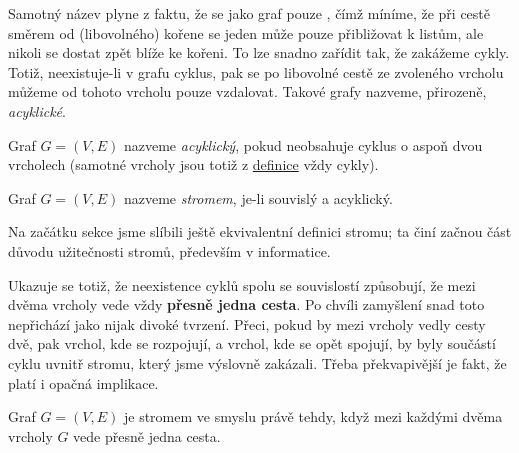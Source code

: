 Samotný název  plyne z faktu, že se jako graf pouze , čímž
míníme, že při cestě směrem od (libovolného) kořene se jeden může pouze
přibližovat k listům, ale nikoli se dostat zpět blíže ke kořeni. To lze snadno
zařídit tak, že zakážeme cykly. Totiž, neexistuje-li v grafu cyklus, pak se po
libovolné cestě ze zvoleného vrcholu můžeme od tohoto vrcholu pouze vzdalovat.
Takové grafy nazveme, přirozeně, \emph{acyklické}.

\begin{definition}
	\label{def:acyklicky-graf}
	Graf $G = (V,E)$ nazveme \emph{acyklický}, pokud neobsahuje cyklus o aspoň dvou
	vrcholech (samotné vrcholy jsou totiž z \hyperref[def:cyklus]{definice} vždy
	cykly).
\end{definition}

\begin{definition}[Strom]
	\label{def:strom}
	Graf $G = (V,E)$ nazveme \emph{stromem}, je-li souvislý a acyklický.
\end{definition}

Na začátku sekce jsme slíbili ještě ekvivalentní definici stromu; ta činí začnou
část důvodu užitečnosti stromů, především v informatice.

Ukazuje se totiž, že neexistence cyklů spolu se souvislostí způsobují, že mezi
dvěma vrcholy vede vždy \textbf{přesně jedna cesta}. Po chvíli zamyšlení snad
toto nepřichází jako nijak divoké tvrzení. Přeci, pokud by mezi vrcholy vedly
cesty dvě, pak vrchol, kde se rozpojují, a vrchol, kde se opět spojují, by byly
součástí cyklu uvnitř stromu, který jsme výslovně zakázali. Třeba překvapivější
je fakt, že platí i opačná implikace.

\begin{claim}
	\label{claim:ekvivalentni-definice-stromu}
	Graf $G = (V,E)$ je stromem ve smyslu  právě tehdy,
	když mezi každými dvěma vrcholy $G$ vede přesně jedna cesta.
\end{claim}

